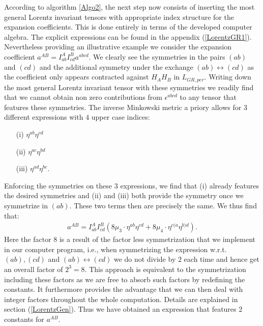 According to algorithm \ref{Algo2}, the next step now consists of inserting the most general Lorentz invariant tensors with appropriate index structure for the expansion coefficients. This is done entirely in terms of the developed computer algebra. The explicit expressions can be found in the appendix (\ref{LorentzGR1}).
Nevertheless providing an illustrative example we consider the expansion coefficient $a^{AB} = I^{A}_{ab}I^{B}_{cd}a^{abcd}$. We clearly see the symmetries in the pairs $(ab)$ and $(cd)$ and the additional symmetry under the exchange $(ab) \leftrightarrow (cd)$ as the coefficient only appears contracted against $H_AH_B$ in $L_{GR,per}$. Writing down the most general Lorentz invariant tensor with these symmetries we readily find that we cannot obtain non zero contributions from $\epsilon^{abcd}$ to any tensor that features these symmetries. The inverse Minkowski metric a priory allows for $3$ different expressions with $4$ upper case indices:
\begin{itemize}
    \item[(i)] $\eta^{ab} \eta^{cd}$ 
    \item[(ii)] $\eta^{ac} \eta^{bd}$ 
    \item[(iii)] $\eta^{ad} \eta^{bc}$.
\end{itemize}
Enforcing the symmetries on these $3$ expressions, we find that (i) already features the desired symmetries and (ii) and (iii) both provide the symmetry once we symmetrize in $(ab)$. These two terms then are precisely the same. We thus find that:
\begin{align}\label{ansatzExample}
    a^{AB} = I^{A}_{ab}I^{B}_{cd} \left ( 8\mu_3 \cdot \eta^{ab}\eta^{cd} + 8\mu_4 \cdot \eta^{c(a} \eta^{b)d}   \right ).
\end{align}
Here the factor $8$ is a result of the factor less symmetrization that we implement in our computer program, i.e., when symmetrizing the expression w.r.t. $(ab),(cd)$ and $(ab) \leftrightarrow (cd) $ we do not divide by $2$ each time and hence get an overall factor of $2^3=8$. This approach is equivalent to the symmetrization including these factors as we are free to absorb such factors by redefining the constants. It furthermore provides the advantage that we can then deal with integer factors throughout the whole computation. Details are explained in section (\ref{LorentzGen}).
Thus we have obtained an expression that features $2$ constants for $a^{AB}$.

